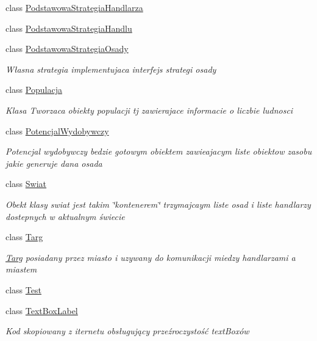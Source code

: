 \begin{DoxyCompactItemize}
\item 
class \hyperlink{class_empire___simulator_1_1_podstawowa_strategia_handlarza}{Podstawowa\+Strategia\+Handlarza}
\item 
class \hyperlink{class_empire___simulator_1_1_podstawowa_strategia_handlu}{Podstawowa\+Strategia\+Handlu}
\item 
class \hyperlink{class_empire___simulator_1_1_podstawowa_strategia_osady}{Podstawowa\+Strategia\+Osady}
\begin{DoxyCompactList}\small\item\em Własna strategia implementujaca interfejs strategi osady \end{DoxyCompactList}\item 
class \hyperlink{class_empire___simulator_1_1_populacja}{Populacja}
\begin{DoxyCompactList}\small\item\em Klasa Tworzaca obiekty populacji tj zawierajace informacie o liczbie ludnosci \end{DoxyCompactList}\item 
class \hyperlink{class_empire___simulator_1_1_potencjal_wydobywczy}{Potencjal\+Wydobywczy}
\begin{DoxyCompactList}\small\item\em Potencjal wydobywczy bedzie gotowym obiektem zawieajacym liste obiektow zasobu jakie generuje dana osada \end{DoxyCompactList}\item 
class \hyperlink{class_empire___simulator_1_1_swiat}{Swiat}
\begin{DoxyCompactList}\small\item\em Obekt klasy swiat jest takim \char`\"{}kontenerem\char`\"{} trzymajcaym liste osad i liste handlarzy dostepnych w aktualnym świecie \end{DoxyCompactList}\item 
class \hyperlink{class_empire___simulator_1_1_targ}{Targ}
\begin{DoxyCompactList}\small\item\em \hyperlink{class_empire___simulator_1_1_targ}{Targ} posiadany przez miasto i uzywany do komunikacji miedzy handlarzami a miastem \end{DoxyCompactList}\item 
class \hyperlink{class_empire___simulator_1_1_test}{Test}
\item 
class \hyperlink{class_empire___simulator_1_1_text_box_label}{Text\+Box\+Label}
\begin{DoxyCompactList}\small\item\em Kod skopiowany z iternetu obsługujący przeźroczystość text\+Boxów \end{DoxyCompactList}\item 

\end{DoxyCompactItemize}
